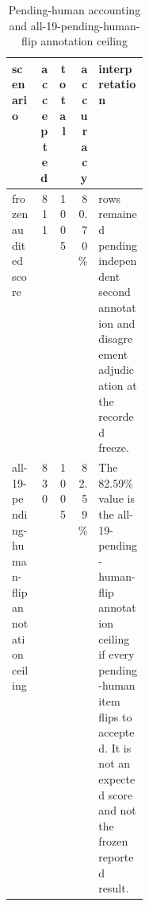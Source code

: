 \begin{table}[htbp]
\centering
\footnotesize
\setlength{\tabcolsep}{5pt}
\caption{Pending-human accounting and all-19-pending-human-flip annotation ceiling}
\label{tab:d5c-pending-annotation-bound}
\begin{tabularx}{\linewidth}{>{\raggedright\arraybackslash}p{0.20\linewidth}rrr>{\raggedright\arraybackslash}X}
\toprule
scenario & accepted & total & accuracy & interpretation \\
\midrule
frozen audited score & 811 & 1005 & 80.70\% & 19 rows remained pending independent second annotation and disagreement adjudication at the recorded freeze. \\
all-19-pending-human-flip annotation ceiling & 830 & 1005 & 82.59\% & The 82.59\% value is the all-19-pending-human-flip annotation ceiling if every pending-human item flips to accepted. It is not an expected score and not the frozen reported result. \\
\bottomrule
\end{tabularx}
\end{table}
